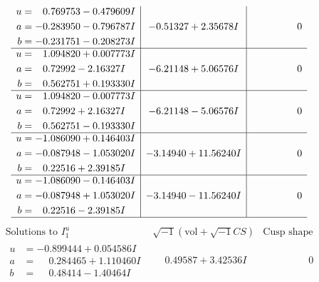 \documentclass[1p]{elsarticle_modified}
\theoremstyle{definition}
\newcommand{\I}{\sqrt{-1}}
\begin{document}
$$\begin{array}{c|c|c}
\begin{aligned}
u &= \phantom{-}0.769753 - 0.479609 I \\
a &= -0.283950 - 0.796787 I \\
b &= -0.231751 - 0.208273 I\end{aligned}
 & -0.51327 + 2.35678 I & \phantom{-0.000000 } 0 \\ \hline\begin{aligned}
u &= \phantom{-}1.094820 + 0.007773 I \\
a &= \phantom{-}0.72992 - 2.16327 I \\
b &= \phantom{-}0.562751 + 0.193330 I\end{aligned}
 & -6.21148 + 5.06576 I & \phantom{-0.000000 } 0 \\ \hline\begin{aligned}
u &= \phantom{-}1.094820 - 0.007773 I \\
a &= \phantom{-}0.72992 + 2.16327 I \\
b &= \phantom{-}0.562751 - 0.193330 I\end{aligned}
 & -6.21148 - 5.06576 I & \phantom{-0.000000 } 0 \\ \hline\begin{aligned}
u &= -1.086090 + 0.146403 I \\
a &= -0.087948 - 1.053020 I \\
b &= \phantom{-}0.22516 + 2.39185 I\end{aligned}
 & -3.14940 + 11.56240 I & \phantom{-0.000000 } 0 \\ \hline\begin{aligned}
u &= -1.086090 - 0.146403 I \\
a &= -0.087948 + 1.053020 I \\
b &= \phantom{-}0.22516 - 2.39185 I\end{aligned}
 & -3.14940 - 11.56240 I & \phantom{-0.000000 } 0\\
 \hline 
 \end{array}$$\newpage$$\begin{array}{c|c|c}  
\text{Solutions to }I^u_{1}& \I (\text{vol} + \sqrt{-1}CS) & \text{Cusp shape}\\
 \hline 
\begin{aligned}
u &= -0.899444 + 0.054586 I \\
a &= \phantom{-}0.284465 + 1.110460 I \\
b &= \phantom{-}0.48414 - 1.40464 I\end{aligned}
 & \phantom{-}0.49587 + 3.42536 I & \phantom{-0.000000 } 0 \\ \hline\begin{aligned}

\end{aligned}
\end{array}$$
\end{document}
